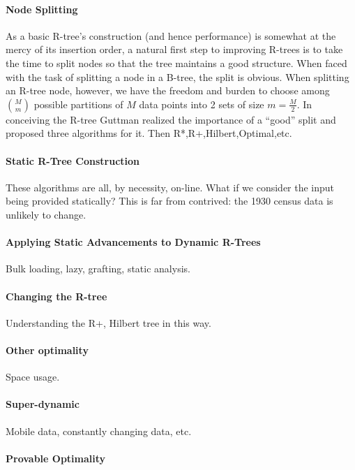 \paragraph{Node Splitting}
As a basic R-tree's construction (and hence performance) is somewhat at the mercy of its insertion order, a natural first step to improving R-trees is to take the time to split nodes so that the tree maintains a good structure.
When faced with the task of splitting a node in a B-tree, the split is obvious.
When splitting an R-tree node, however, we have the freedom and burden to choose among $\binom{M}{m}$ possible partitions of $M$ data points into 2 sets of size $m=\frac{M}{2}$.
In conceiving the R-tree Guttman realized the importance of a ``good'' split and proposed three algorithms for it.
Then R*,R+,Hilbert,Optimal,etc.

\paragraph{Static R-Tree Construction}
These algorithms are all, by necessity, on-line.
What if we consider the input being provided statically?
This is far from contrived: the 1930 census data is unlikely to change.


\paragraph{Applying Static Advancements to Dynamic R-Trees}
Bulk loading, lazy, grafting, static analysis.


\paragraph{Changing the R-tree}
Understanding the R+, Hilbert tree in this way.

\paragraph{Other optimality}
Space usage.

\paragraph{Super-dynamic}
Mobile data, constantly changing data, etc.


\paragraph{Provable Optimality}




